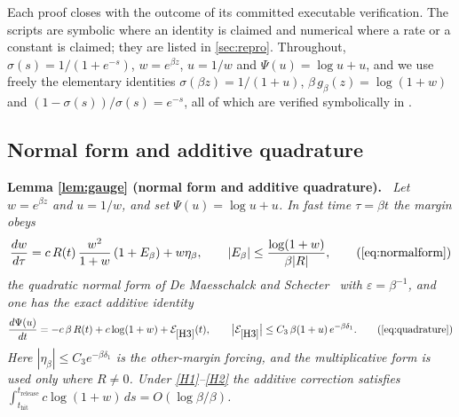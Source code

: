 \documentclass[11pt]{article}
\theoremstyle{definition}
\theoremstyle{remark}
\newcommand{\thit}{t_{\mathrm{hit}}}
\newcommand{\trel}{t_{\mathrm{release}}}
\newenvironment{lemmarep}[2]{%
  \par\medskip\noindent\textbf{Lemma \ref{#1} (#2).}\itshape\ \ignorespaces}%
  {\par\medskip}
\begin{document}
Each proof closes with the outcome of its committed executable verification. The
scripts are symbolic where an identity is claimed and numerical where a rate or a
constant is claimed; they are listed in \cref{sec:repro}. Throughout,
$\sigma(s)=1/(1+e^{-s})$, $w=e^{\beta z}$, $u=1/w$ and $\Psi(u)=\log u+u$, and we
use freely the elementary identities $\sigma(\beta z)=1/(1+u)$,
$\beta\,g_\beta(z)=\log(1+w)$ and $(1-\sigma(s))/\sigma(s)=e^{-s}$, all of which
are verified symbolically in .

\subsection{Normal form and additive quadrature}\label{app:L1}

\begin{lemmarep}{lem:gauge}{normal form and additive quadrature}
Let $w=e^{\beta z}$ and $u=1/w$, and set $\Psi(u)=\log u+u$. In fast time
$\tau=\beta t$ the margin obeys
\begin{equation*}
\frac{dw}{d\tau}=c\,R(t)\,\frac{w^{2}}{1+w}\,(1+E_\beta)+w\eta_\beta,
\qquad
|E_\beta|\le\frac{\log(1+w)}{\beta|R|},
\tag{\ref{eq:normalform}}
\end{equation*}
the quadratic normal form of De Maesschalck and
Schecter~\cite[equations~(1.9)--(1.10)]{DMS16} with $\varepsilon=\beta^{-1}$,
and one has the exact additive
identity
\begin{equation*}
\frac{d\Psi(u)}{dt}=-c\,\beta\,R(t)+c\log(1+w)+\mathcal{E}_{\eqref{H3}}(t),
\qquad
\bigl|\mathcal{E}_{\eqref{H3}}\bigr|\le C_3\,\beta(1+u)\,e^{-\beta\delta_1}.
\tag{\ref{eq:quadrature}}
\end{equation*}
Here $|\eta_\beta|\le C_3e^{-\beta\delta_1}$ is the other-margin
forcing, and the multiplicative form is used only where $R\ne0$.
Under \eqref{H1}--\eqref{H2} the additive correction satisfies
$\int_{\thit}^{\trel}c\log(1+w)\,ds=O(\log\beta/\beta)$.
\end{lemmarep}
\end{document}
